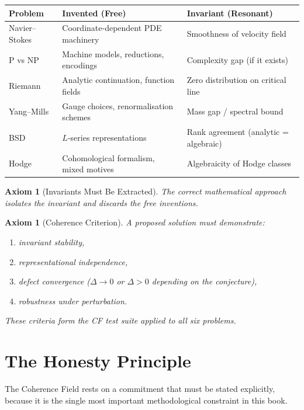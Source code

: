 \documentclass[12pt, openany]{book}
\newtheorem{axiom}[theorem]{Axiom}
\theoremstyle{remark}
\begin{document}
\begin{center}
\begin{tabular}{@{}lll@{}}
\toprule
\textbf{Problem} & \textbf{Invented (Free)} & \textbf{Invariant (Resonant)} \\
\midrule
Navier--Stokes & Coordinate-dependent PDE machinery & Smoothness of velocity field \\
P vs NP        & Machine models, reductions, encodings & Complexity gap (if it exists) \\
Riemann        & Analytic continuation, function fields & Zero distribution on critical line \\
Yang--Mills    & Gauge choices, renormalisation schemes & Mass gap / spectral bound \\
BSD            & $L$-series representations & Rank agreement (analytic = algebraic) \\
Hodge          & Cohomological formalism, mixed motives & Algebraicity of Hodge classes \\
\bottomrule
\end{tabular}
\end{center}

\begin{axiom}[Invariants Must Be Extracted]\label{ax:extract}
The correct mathematical approach isolates the invariant and discards the free inventions.
\end{axiom}

\begin{axiom}[Coherence Criterion]\label{ax:coherence-crit}
A proposed solution must demonstrate:
\begin{enumerate}
  \item invariant stability,
  \item representational independence,
  \item defect convergence ($\Delta \to 0$ or $\Delta > 0$ depending on the conjecture),
  \item robustness under perturbation.
\end{enumerate}
These criteria form the CF test suite applied to all six problems.
\end{axiom}

\section{The Honesty Principle}
\label{sec:found-honesty}

The Coherence Field rests on a commitment that must be stated explicitly, because
it is the single most important methodological constraint in this book.
\end{document}
